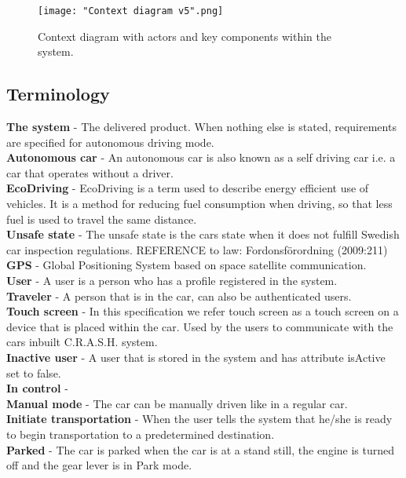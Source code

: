 \documentclass{article}
\begin{document}
\begin{figure}[htb]    
 \centering
  \texttt{[image: "Context diagram v5".png]}%
  \caption{Context diagram with actors and key components within the system.}
  \label{ContextDiagram}
\end{figure}

\subsection{Terminology}
\textbf{The system} - The delivered product. When nothing else is stated, requirements are specified for autonomous driving mode.\\
\textbf{Autonomous car} - An autonomous car is also known as a self driving car i.e. a car that operates without a driver. \\
\textbf{EcoDriving} - EcoDriving is a term used to describe energy efficient use of vehicles. It is a method for reducing fuel consumption when driving, so that less fuel is used to travel the same distance.\\
\textbf{Unsafe state} - The unsafe state is the cars state when it does not fulfill Swedish car inspection regulations.
REFERENCE to law: Fordonsförordning (2009:211) \\
\textbf{GPS} - Global Positioning System based on space satellite communication.\\
\textbf{User} - A user is a person who has a profile registered in the system. \\
\textbf{Traveler} - A person that is in the car, can also be authenticated users. \\
\textbf{Touch screen} - In this specification we refer touch screen as a touch screen on a device that is placed within the car. Used by the users to  communicate with the cars inbuilt C.R.A.S.H. system. \\
\textbf{Inactive user} - A user that is stored in the system and has attribute isActive set to false. \\
\textbf{In control} - \\
\textbf{Manual mode} - The car can be manually driven like in a regular car.\\
\textbf{Initiate transportation} - When the user tells the system that he/she is ready to begin transportation to a predetermined destination. \\
\textbf{Parked} - The car is parked when the car is at a stand still, the engine is turned off and the gear lever is in Park mode.  \\
\end{document}
